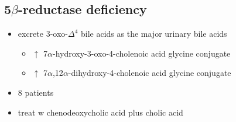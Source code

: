 \documentclass{scrartcl}
\begin{document}
\subsection{5\(\beta\)-reductase deficiency}
\label{sec:orgbf43568}
\begin{itemize}
\item excrete 3-oxo-\(\Delta^{\text{4}}\) bile acids as the major urinary bile acids
\begin{itemize}
\item \(\uparrow\) 7\(\alpha\)-hydroxy-3-oxo-4-cholenoic acid glycine conjugate
\item \(\uparrow\) 7\(\alpha\),12\(\alpha\)-dihydroxy-4-cholenoic acid glycine conjugate
\end{itemize}
\item 8 patients
\item treat w chenodeoxycholic acid plus cholic acid
\end{itemize}
\end{document}

